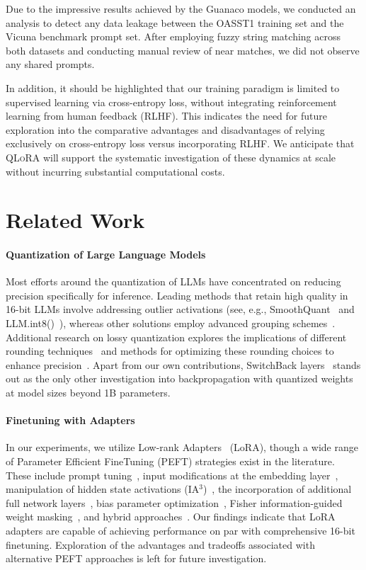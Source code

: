 Due to the impressive results achieved by the {Guanaco} models, we conducted an analysis to detect any data leakage between the OASST1 training set and the Vicuna benchmark prompt set. After employing fuzzy string matching across both datasets and conducting manual review of near matches, we did not observe any shared prompts.

In addition, it should be highlighted that our training paradigm is limited to supervised learning via cross-entropy loss, without integrating reinforcement learning from human feedback (RLHF). This indicates the need for future exploration into the comparative advantages and disadvantages of relying exclusively on cross-entropy loss versus incorporating RLHF. We anticipate that \textsc{QLoRA} will support the systematic investigation of these dynamics at scale without incurring substantial computational costs.

\section{Related Work}

\paragraph{Quantization of Large Language Models} Most efforts around the quantization of LLMs have concentrated on reducing precision specifically for inference. Leading methods that retain high quality in 16-bit LLMs involve addressing outlier activations (see, e.g., SmoothQuant~\citep{xiao2022smoothquant} and LLM.int8()~\citep{dettmers2022llm}), whereas other solutions employ advanced grouping schemes~\citep{park2022nuqmm, yao2022zeroquant}. Additional research on lossy quantization explores the implications of different rounding techniques~\citep{dettmers2022case,zeng2022glm,pope2022efficiently} and methods for optimizing these rounding choices to enhance precision~\citep{frantar2022gptq}. Apart from our own contributions, SwitchBack layers~\citep{wortsman2023stable} stands out as the only other investigation into backpropagation with quantized weights at model sizes beyond 1B parameters.

\paragraph{Finetuning with Adapters} In our experiments, we utilize Low-rank Adapters~\citep{hu2021lora} (LoRA), though a wide range of Parameter Efficient FineTuning (PEFT) strategies exist in the literature. These include prompt tuning~\citep{qin2021learning,lester2021power,li2021prefix}, input modifications at the embedding layer~\citep{an2022input}, manipulation of hidden state activations (IA$^3$)~\citep{liu2022few}, the incorporation of additional full network layers~\citep{houlsby2019parameter}, bias parameter optimization~\citep{zaken2021bitfit}, Fisher information-guided weight masking~\citep{sung2021training}, and hybrid approaches~\citep{henderson2021compacter}. Our findings indicate that LoRA adapters are capable of achieving performance on par with comprehensive 16-bit finetuning. Exploration of the advantages and tradeoffs associated with alternative PEFT approaches is left for future investigation.

